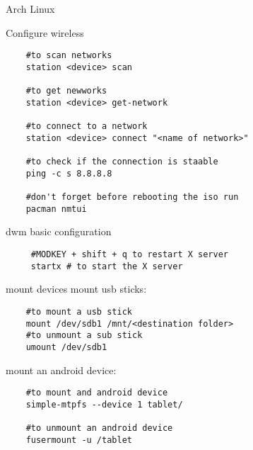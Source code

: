 \begin{section}{Arch Linux}
\begin{subsection}{Configure wireless}
\begin{verbatim}
	#to scan networks
	station <device> scan

	#to get newworks
	station <device> get-network

	#to connect to a network
	station <device> connect "<name of network>"

	#to check if the connection is staable
	ping -c s 8.8.8.8

	#don't forget before rebooting the iso run
	pacman nmtui
\end{verbatim}

 dwm basic configuration
 \begin{verbatim}
	 #MODKEY + shift + q to restart X server
	 startx # to start the X server
\end{verbatim}

\end{subsection}
\begin{subsection}{mount devices}
mount usb sticks:
\begin{verbatim}
	#to mount a usb stick
	mount /dev/sdb1 /mnt/<destination folder>
	#to unmount a sub stick
	umount /dev/sdb1
\end{verbatim}
mount an android device:
\begin{verbatim}
	#to mount and android device
	simple-mtpfs --device 1 tablet/

	#to unmount an android device
	fusermount -u /tablet
\end{verbatim}

\end{subsection}

\end{section}

